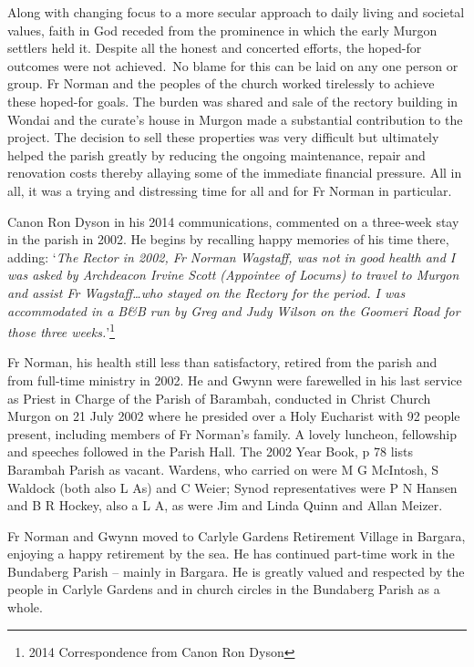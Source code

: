 Along with changing focus to a more secular approach to daily living and societal values, faith in God receded from the prominence in which the early Murgon settlers held it. Despite all the honest and concerted efforts, the hoped-for outcomes were not achieved.~No blame for this can be laid on any one person or group. Fr Norman and the peoples of the church worked tirelessly to achieve these hoped-for goals. The burden was shared and sale of the rectory building in Wondai and the curate's house in Murgon made a substantial contribution to the project. The decision to sell these properties was very difficult but ultimately helped the parish greatly by reducing the ongoing maintenance, repair and renovation costs thereby allaying some of the immediate financial pressure. All in all, it was a trying and distressing time for all and for Fr Norman in particular.



Canon Ron Dyson in his 2014 communications, commented on a three-week stay in the parish in 2002. He begins by recalling happy memories of his time there, adding: `\emph{The Rector in 2002, Fr Norman Wagstaff, was not in good health and I was asked by Archdeacon Irvine Scott (Appointee of Locums) to travel to Murgon and assist Fr Wagstaff\ldots who stayed on the Rectory for the period. I was accommodated in a B\&B run by Greg and Judy Wilson on the Goomeri Road for those three weeks.}'\footnote{2014 Correspondence from Canon Ron Dyson}


Fr Norman, his health still less than satisfactory, retired from the parish and from full-time ministry in 2002. He and Gwynn were farewelled in his last service as Priest in Charge of the Parish of Barambah, conducted in Christ Church Murgon on 21 July 2002 where he presided over a Holy Eucharist with 92 people present, including members of Fr Norman's family. A lovely luncheon, fellowship and speeches followed in the Parish Hall. The 2002 Year Book, p 78 lists Barambah Parish as vacant. Wardens, who carried on were M G McIntosh, S Waldock (both also L As) and C Weier; Synod representatives were P N Hansen and B R Hockey, also a L A, as were Jim and Linda Quinn and Allan Meizer.



Fr Norman and Gwynn moved to Carlyle Gardens Retirement Village in Bargara, enjoying a happy retirement by the sea. He has continued part-time work in the Bundaberg Parish -- mainly in Bargara. He is greatly valued and respected by the people in Carlyle Gardens and in church circles in the Bundaberg Parish as a whole.



